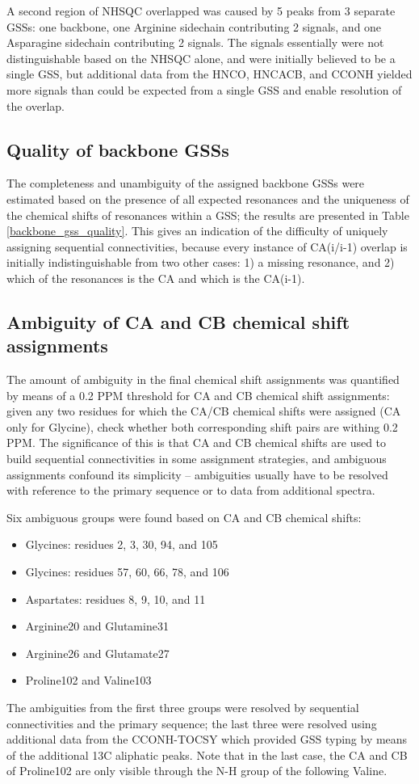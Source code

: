 A second region of NHSQC overlapped was caused by 5 peaks from 3 separate 
GSSs: one backbone, one Arginine sidechain contributing 2 signals, and one
Asparagine sidechain contributing 2 signals.  The signals essentially were not
distinguishable based on the NHSQC alone, and were initially believed to be 
a single GSS, but additional data from the HNCO, HNCACB, and CCONH yielded
more signals than could be expected from a single GSS and enable resolution of
the overlap.

\subsection*{Quality of backbone GSSs}
The completeness and unambiguity of the assigned backbone GSSs were estimated
based on the presence of all expected resonances and the uniqueness of the
chemical shifts of resonances within a GSS; the results are presented in
Table \ref{backbone_gss_quality}.  This gives an indication of the difficulty
of uniquely assigning sequential connectivities, because every instance of
CA(i/i-1) overlap is initially indistinguishable from two other cases: 1) a 
missing resonance, and 2) which of the resonances is the CA and which is the
CA(i-1).

\subsection*{Ambiguity of CA and CB chemical shift assignments}
The amount of ambiguity in the final chemical shift assignments was
quantified by means of a 0.2 PPM threshold for CA and CB chemical shift 
assignments: given any two residues for which the CA/CB chemical shifts 
were assigned (CA only for Glycine), check whether both corresponding
shift pairs are withing 0.2 PPM.  The significance of this is that CA and CB
chemical shifts are used to build sequential connectivities in some assignment
strategies, and ambiguous assignments confound its simplicity -- ambiguities
usually have to be resolved with reference to the primary sequence or to 
data from additional spectra.

Six ambiguous groups were found based on CA and CB chemical shifts:
\begin{itemize}
  \item Glycines: residues 2, 3, 30, 94, and 105
  \item Glycines: residues 57, 60, 66, 78, and 106
  \item Aspartates: residues 8, 9, 10, and 11
  \item Arginine20 and Glutamine31
  \item Arginine26 and Glutamate27
  \item Proline102 and Valine103
\end{itemize}
The ambiguities from the first three groups were resolved by sequential 
connectivities and the primary sequence; the last three were resolved using
additional data from the CCONH-TOCSY which provided GSS typing by means of 
the additional 13C aliphatic peaks.  Note that in the last case, the CA and
CB of Proline102 are only visible through the N-H group of the following
Valine.


